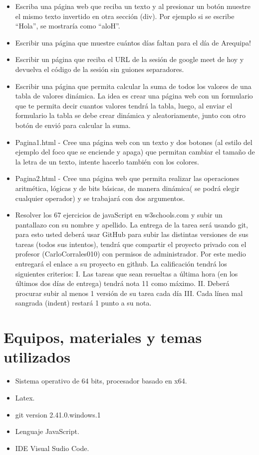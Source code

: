 \documentclass{article}
\begin{document}
\begin{itemize}
		\item Escriba una página web que reciba un texto y al presionar un botón muestre el mismo texto invertido en otra sección (div). Por ejemplo si se escribe “Hola”, se mostraría como “aloH”.
		\item Escribir una página que muestre cuántos días faltan para el día de Arequipa!
		\item Escribir un página que reciba el URL de la sesión de google meet de hoy y devuelva el código de la sesión sin guiones separadores.
		\item Escribir una página que permita calcular la suma de todos los valores de una tabla de valores dinámica. La idea es crear una página web con un formulario que te permita decir cuantos valores tendrá la tabla, luego, al enviar el formulario la tabla se debe crear dinámica y aleatoriamente, junto con otro botón de envió para calcular la suma.
		\item Pagina1.html - Cree una página web con un texto y dos botones (al estilo del ejemplo del foco que se enciende y apaga) que permitan cambiar el tamaño de la letra de un texto, intente hacerlo también con los colores.
		\item Pagina2.html - Cree una página web que permita realizar las operaciones aritmética, lógicas y de bits básicas, de manera dinámica( se podrá elegir cualquier operador) y se trabajará con dos argumentos.
		\item Resolver los 67 ejercicios de javaScript en w3schools.com y subir un pantallazo con su nombre y apellido.
		La entrega de la tarea será usando git, para esto usted deberá usar GitHub para subir las distintas versiones de sus tareas (todos sus intentos), tendrá que compartir el proyecto privado con el profesor (CarloCorrales010) con permisos de administrador.  Por este medio entregará el enlace a su proyecto en github.
		La calificación tendrá los siguientes criterios:
		I. Las tareas que sean resueltas a última hora (en los últimos dos días de entrega) tendrá nota 11 como máximo.
		II. Deberá procurar subir al menos 1 versión de su tarea cada día
		III.  Cada línea mal sangrada (indent) restará 1 punto a su nota.
		
	\end{itemize}
	
	\section{Equipos, materiales y temas utilizados}
	\begin{itemize}
		\item Sistema operativo de 64 bits, procesador basado en x64.
		\item Latex. 
		\item git version 2.41.0.windows.1
		\item Lenguaje JavaScript.
		\item IDE Visual Sudio Code.
	\end{itemize}
\end{document}
